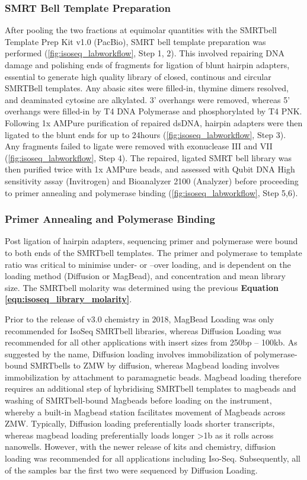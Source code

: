 \subsubsection{SMRT Bell Template Preparation}
\label{section:ch2_smrtbelltemplate_explanation} 
After pooling the two fractions at equimolar quantities with the SMRTbell Template Prep Kit v1.0 (PacBio), SMRT bell template preparation was performed (\cref{fig:isoseq_labworkflow}, Step 1, 2). This involved repairing DNA damage and polishing ends of fragments for ligation of blunt hairpin adapters, essential to generate high quality library of closed, continous and circular SMRTBell templates. Any abasic sites were filled-in, thymine dimers resolved, and deaminated cytosine are alkylated. 3’ overhangs were removed, whereas 5’ overhangs were filled-in by T4 DNA Polymerase and phosphorylated by T4 PNK. Following 1x AMPure purification of repaired dsDNA, hairpin adapters were then ligated to the blunt ends for up to 24hours (\cref{fig:isoseq_labworkflow}, Step 3). Any fragments failed to ligate were removed with exonuclease III and VII (\cref{fig:isoseq_labworkflow}, Step 4). The repaired, ligated SMRT bell library was then purified twice with 1x AMPure beads, and assessed with Qubit DNA High sensitivity assay (Invitrogen) and Bioanalyzer 2100 (Analyzer) before proceeding to primer annealing and polymerase binding (\cref{fig:isoseq_labworkflow}, Step 5,6). 

\subsubsection{Primer Annealing and Polymerase Binding} 
\label{section:ch2_polbinding_loading}
Post ligation of hairpin adapters, sequencing primer and polymerase were bound to both ends of the SMRTbell templates. The primer and polymerase to template ratio was critical to minimise under- or –over loading, and is dependent on the loading method (Diffusion or MagBead), and concentration and mean library size. The SMRTbell molarity was determined using the previous \textbf{Equation \ref{eqn:isoseq_library_molarity}}.

Prior to the release of v3.0 chemistry in 2018, MagBead Loading was only recommended for IsoSeq SMRTbell libraries, whereas Diffusion Loading was recommended for all other applications with insert sizes from 250bp – 100kb. As suggested by the name, Diffusion loading involves immobilization of polymerase-bound SMRTbells to ZMW by diffusion, whereas Magbead loading involves immobilization by attachment to paramagnetic beads. Magbead loading therefore requires an additional step of hybridising SMRTbell templates to magbeads and washing of SMRTbell-bound Magbeads before loading on the instrument, whereby a built-in Magbead station facilitates movement of Magbeads across ZMW. Typically, Diffusion loading preferentially loads shorter transcripts, whereas magbead loading preferentially loads longer >1b as it rolls across nanowells. However, with the newer release of kits and chemistry, diffusion loading was recommended for all applications including Iso-Seq. Subsequently, all of the samples bar the first two were sequenced by Diffusion Loading. 


